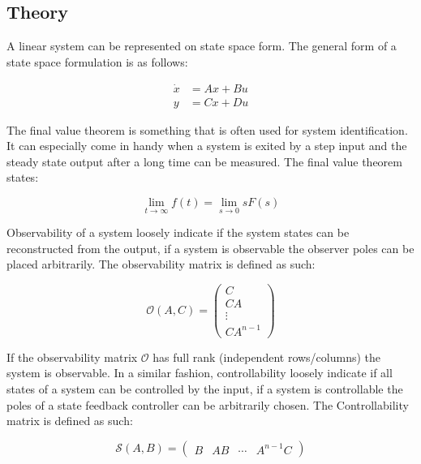 \documentclass[a4paper, titlepage]{article}
\begin{document}
\subsection{Theory}
A linear system can be represented on state space form.
The general form of a state space formulation is as follows:

\begin{equation}
\begin{split}
\dot{x} &= Ax + Bu \\
y &= Cx + Du
\end{split}
\label{equ:stateSpace}
\end{equation}


The final value theorem is something that is often used for system identification.
It can especially come in handy when a system is exited by a step input and the steady state output after a long time can be measured.
The final value theorem states:

\begin{equation}
\lim_{t \to \infty} f(t) = \lim_{s \to 0} sF(s)
\label{equ:finalTheorem}
\end{equation}

Observability of a system loosely indicate if the system states can be reconstructed from the output, if a system is observable the observer poles can be placed arbitrarily.
The observability matrix is defined as such:

\begin{equation}
\mathcal{O}(A,C) = 
\begin{pmatrix}
C \\ CA \\ \vdots \\ CA^{n-1}
\end{pmatrix}
\label{equ:observ}
\end{equation}

If the observability matrix $\mathcal{O}$ has full rank (independent rows/columns) the system is observable.
In a similar fashion, controllability loosely indicate if all states of a system can be controlled by the input, if a system is controllable the poles of a state feedback controller can be arbitrarily chosen.
The Controllability matrix is defined as such:

\begin{equation}
\mathcal{S}(A,B) = 
\begin{pmatrix}
B & AB & \cdots & A^{n-1}C
\end{pmatrix}
\label{equ:contr}
\end{equation}
\end{document}
